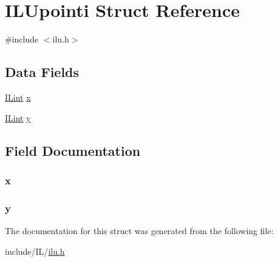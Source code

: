 \hypertarget{struct_i_l_upointi}{\section{I\-L\-Upointi Struct Reference}
\label{struct_i_l_upointi}
}


{\ttfamily \#include $<$ilu.\-h$>$}

\subsection*{Data Fields}
\begin{DoxyCompactItemize}
\item 
\hyperlink{il_8h_a288a97fb9e92e707a60b749d0039fafe}{I\-Lint} \hyperlink{struct_i_l_upointi_a08e8db6d88cf765e04038598c571d2d1}{x}
\item 
\hyperlink{il_8h_a288a97fb9e92e707a60b749d0039fafe}{I\-Lint} \hyperlink{struct_i_l_upointi_abe523ff61c0d360d3139b1066c132d2f}{y}
\end{DoxyCompactItemize}


\subsection{Field Documentation}
\hypertarget{struct_i_l_upointi_a08e8db6d88cf765e04038598c571d2d1}{
\subsubsection[{x}]{ x}}\label{struct_i_l_upointi_a08e8db6d88cf765e04038598c571d2d1}
\hypertarget{struct_i_l_upointi_abe523ff61c0d360d3139b1066c132d2f}{
\subsubsection[{y}]{ y}}\label{struct_i_l_upointi_abe523ff61c0d360d3139b1066c132d2f}


The documentation for this struct was generated from the following file\-:\begin{DoxyCompactItemize}
\item 
include/\-I\-L/\hyperlink{ilu_8h}{ilu.\-h}\end{DoxyCompactItemize}
